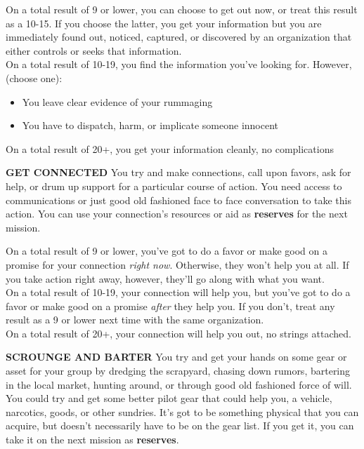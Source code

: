 On a total result of 9 or lower, you can choose to get out now, or treat this result as a 10-15. If you choose the latter, you get your information but you are immediately found out, noticed, captured, or discovered by an organization that either controls or seeks that information.\\
On a total result of 10-19, you find the information you've looking for. However, (choose one):
\begin{itemize}
\item You leave clear evidence of your rummaging
\item You have to dispatch, harm, or implicate someone innocent
\end{itemize}  
On a total result of 20+, you get your information cleanly, no complications

\textbf{GET CONNECTED}
You try and make connections, call upon favors, ask for help, or drum up support for a particular course of action. You need access to communications or just good old fashioned face to face conversation to take this action. You can use your connection's resources or aid as \textbf{reserves} for the next mission.

On a total result of 9 or lower, you've got to do a favor or make good on a promise for your connection \textit{right now}. Otherwise, they won't help you at all. If you take action right away, however, they'll go along with what you want.\\
On a total result of 10-19, your connection will help you, but you've got to do a favor or make good on a promise \textit{after} they help you. If you don't, treat any result as a 9 or lower next time with the same organization.\\
On a total result of 20+, your connection will help you out, no strings attached.

\textbf{SCROUNGE AND BARTER}
You try and get your hands on some gear or asset for your group by dredging the scrapyard, chasing down rumors, bartering in the local market, hunting around, or through good old fashioned force of will. You could try and get some better pilot gear that could help you, a vehicle, narcotics, goods, or other sundries. It's got to be something physical that you can acquire, but doesn't necessarily have to be on the gear list. If you get it, you can take it on the next mission as \textbf{reserves}.

